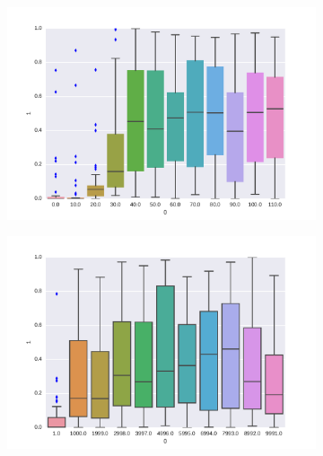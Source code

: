 \documentclass{article}
\begin{document}
\begin{figure}
\begin{subfigure}{.5\textwidth}
\includegraphics[width=\textwidth]{./img/mcmc_mixing.pdf}
\end{subfigure}%
\begin{subfigure}{.5\textwidth}
\includegraphics[width=\textwidth]{./img/sgld_mixing.pdf}
\end{subfigure}%
\end{figure}
\end{document}
